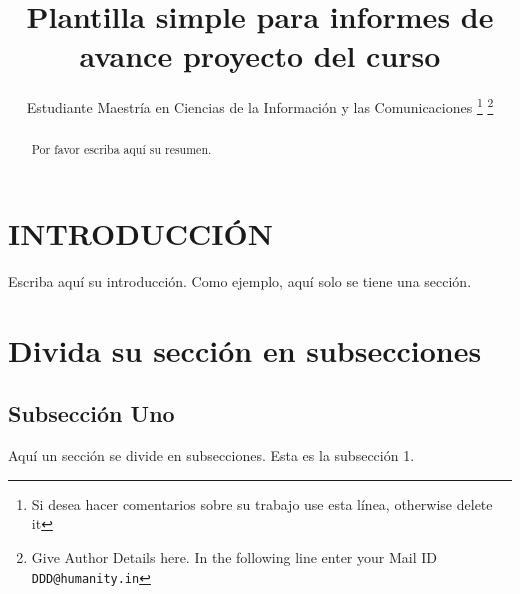 \documentclass[a4paper, 10pt, conference]{ieeeconf}      %
\title{\LARGE \bf Plantilla simple para informes de avance proyecto del curso}
\author{Estudiante Maestría en Ciencias de la Información y las Comunicaciones
\thanks{Si desea hacer comentarios sobre su trabajo use esta línea, otherwise delete it}
\thanks{Give Author Details here. In the following line enter your Mail ID 
                  {\tt\small DDD@humanity.in}}
}
\begin{document}
\maketitle
\thispagestyle{empty}
\pagestyle{empty}



\begin{abstract}

Por favor escriba aquí su resumen.


\end{abstract}



\section{INTRODUCCIÓN}

Escriba aquí su introducción. Como ejemplo, aquí solo se tiene una sección.


\section{Divida su sección en subsecciones}
\subsection{Subsección Uno}

Aquí un sección se divide en subsecciones. Esta es la subsección 1. 

\end{document}
